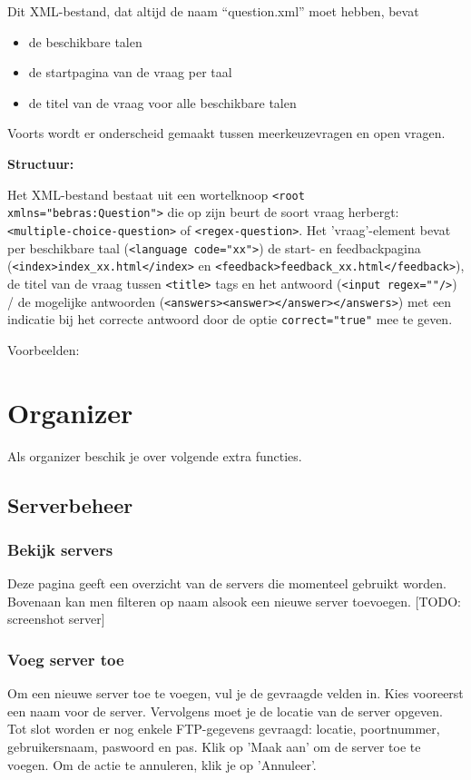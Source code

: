\documentclass[]{article}
\begin{document}
Dit XML-bestand, dat altijd de naam "`question.xml"' moet hebben, bevat
\begin{itemize}
\item de beschikbare talen
\item de startpagina van de vraag per taal
\item de titel van de vraag voor alle beschikbare talen
\end{itemize}

Voorts wordt er onderscheid gemaakt tussen meerkeuzevragen en open vragen.

\textbf{Structuur:}

Het XML-bestand bestaat uit een wortelknoop \verb+<root xmlns="bebras:Question">+ 
die op zijn beurt de soort vraag herbergt: \verb+<multiple-choice-question>+ of \verb+<regex-question>+.
Het 'vraag'-element bevat per beschikbare taal (\verb+<language code="xx">+) 
de start- en feedbackpagina (\verb+<index>index_xx.html</index>+ en \verb+<feedback>feedback_xx.html</feedback>+), 
de titel van de vraag tussen \verb+<title>+ tags 
en het antwoord (\verb+<input regex=""/>+) / de mogelijke antwoorden (\verb+<answers><answer></answer></answers>+)
met een indicatie bij het correcte antwoord door de optie \verb+correct="true"+ mee te geven.

Voorbeelden:

 

\section{Organizer}

Als organizer beschik je over volgende extra functies.

\subsection{Serverbeheer}

\subsubsection{Bekijk servers}
Deze pagina geeft een overzicht van de servers die momenteel gebruikt worden. Bovenaan kan men filteren op naam alsook een nieuwe server toevoegen. [TODO: screenshot server]

\subsubsection{Voeg server toe}
Om een nieuwe server toe te voegen, vul je de gevraagde velden in. Kies vooreerst een naam voor de server. Vervolgens moet je de locatie van de server opgeven. Tot slot worden er nog enkele FTP-gegevens gevraagd: locatie, poortnummer, gebruikersnaam, paswoord en pas. Klik op 'Maak aan' om de server toe te voegen. Om de actie te annuleren, klik je op 'Annuleer'.
\end{document}
